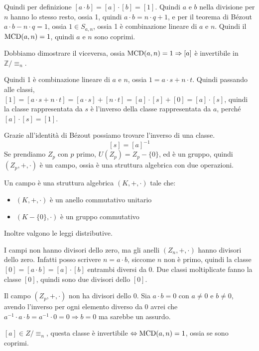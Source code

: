 Quindi per definizione $[a \cdot b] = [a] \cdot [b] = [1]$. Quindi $a$ e $b$ nella divisione per $n$ hanno lo stesso resto, ossia 1, quindi $a \cdot b = n \cdot q + 1$, e per il teorema di B\'ezout $a \cdot b - n \cdot q = 1$, ossia $1 \in S_{a, n}$, ossia 1 \`e combinazione lineare di $a$ e $n$. Quindi il $\operatorname{MCD}(a, n) = 1$, quindi $a$ e $n$ sono coprimi.

Dobbiamo dimostrare il viceversa, ossia $\operatorname{MCD}(a, n) = 1 \Rightarrow [a]$ \`e invertibile in $\mathbb{Z} / \equiv_n$.

Quindi 1 \`e combinazione lineare di $a$ e $n$, ossia $1 = a \cdot s + n \cdot t$. Quindi passando alle classi, $[1] = [a \cdot s + n \cdot t] = [a \cdot s] + [n \cdot t] = [a] \cdot [s] + [0] = [a] \cdot [s]$, quindi la classe rappresentata da $s$ \`e l'inverso della classe rappresentata da $a$, perch\'e $[a] \cdot [s] = [1]$.

Grazie all'identit\`a di B\'ezout possiamo trovare l'inverso di una classe.
\[
[s] = [a]^{-1}
\]
Se prendiamo $Z_p$ con $p$ primo, $U(Z_p) = Z_p - \{ 0 \}$, ed \`e un gruppo, quindi $(Z_p, +, \cdot)$ \`e un campo, ossia \`e una struttura algebrica con due operazioni.

Un campo \`e una struttura algebrica $(K, +, \cdot)$ tale che:
\begin{itemize}
    \item $(K, +, \cdot)$ \`e un anello commutativo unitario
    \item $(K - \{0\}, \cdot)$ \`e un gruppo commutativo
\end{itemize}
Inoltre valgono le leggi distributive.

I campi non hanno divisori dello zero, ma gli anelli $(Z_n, +, \cdot)$ hanno divisori dello zero. Infatti posso scrivere $n = a \cdot b$, siccome $n$ non \`e primo, quindi la classe $[0] = [a \cdot b] = [a] \cdot [b]$ entrambi diversi da 0. Due classi moltiplicate fanno la classe $[0]$, quindi sono due divisori dello $[0]$.

Il campo $(Z_p, +, \cdot)$ non ha divisori dello 0. Sia $a \cdot  b = 0$ con $a \neq 0$ e $b \neq 0$, avendo l'inverso per ogni elemento diverso da 0 avrei che $a^{-1} \cdot a \cdot b = a^{-1} \cdot 0 = 0 \Rightarrow b = 0$ ma sarebbe un assurdo.

\begin{theorem}
$[a] \in Z / \equiv_n$, questa classe \`e invertibile $\Leftrightarrow \operatorname{MCD}(a, n) = 1$, ossia se sono coprimi.
\end{theorem}

